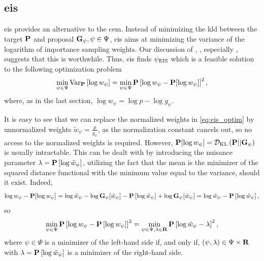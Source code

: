 \subsection{\texorpdfstring{\Acrfull{eis}}{Efficient importance sampling}}
\label{subsec:eis}
\gls{eis} \citep{Richard2007Efficient} provides an alternative to the \gls{cem}. Instead of minimizing the \gls{kld} between the target $\P$ and proposal $\G_{\psi}, \psi \in \Psi$, \gls{eis} aims at minimizing the variance of the logarithm of importance sampling weights. 
Our discussion of \citep{Chatterjee2018Sample}, , especially , suggests that this is worthwhile. 
Thus, \gls{eis} finds $\peis$ which is a feasible solution to the following optimization problem
\begin{align}
    \label{eq:eis_optim}
\min_{\psi \in \Psi} \text{Var}_{\P} \left[ \log w_{\psi} \right] = \min_{\psi \in \Psi} \P \left[ \log w_{\psi} - \P [\log w_{\psi}] \right]^{2},
\end{align}
where, as in the last section, $\log w_{\psi} = \log p - \log g_{\psi}$.

It is easy to see that we can replace the normalized weights in \eqref{eq:eis_optim} by unnormalized weights $\tilde w_{\psi} = \frac{p}{g_{\psi}}$, as the normalization constant cancels out, so no access to the normalized weights is required.
However, $\P [\log w_{\psi}] = \Dkl{\P}{\G_{\psi}}$ is usually intractable. This can be dealt with by introducing the nuisance parameter $\lambda = \P \left[ \log \tilde w_{\psi} \right]$, utilizing the fact that the mean is the minimizer of the squared distance functional with the minimum value equal to the variance, should it exist. Indeed,
$$
    \log w_{\psi} - \P [\log w_{\psi}] = \log \tilde w_{\psi} - \log \G_{\psi} [\tilde w_{\psi}] - \P \left[ \log \tilde w_{\psi} \right] + \log \G_{\psi}[\tilde w_{\psi}] = \log \tilde w_{\psi} - \P \left[ \log \tilde w_{\psi} \right],
$$
so
$$
    \min_{\psi \in \Psi} \P \left[ \log w_{\psi} - \P \left[ \log w_{\psi} \right] \right]^{2} = \min_{\psi \in \Psi, \lambda \in \R} \P \left[ \log \tilde w_{\psi} - \lambda \right]^{2},
$$
where $\psi\in \Psi$ is a minimizer of the left-hand side if, and only if, $(\psi, \lambda) \in \Psi \times \R$ with $\lambda = \P \left[ \log \tilde w_{\psi} \right]$ is a minimizer of the right-hand side. 

